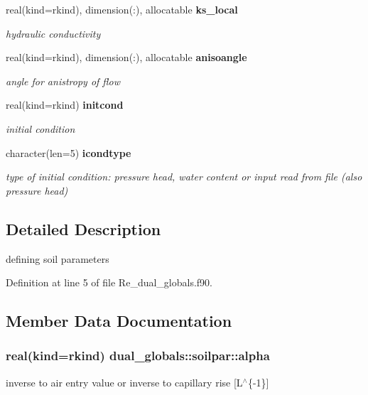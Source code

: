 \begin{DoxyCompactItemize}
real(kind=rkind), dimension(\+:), allocatable {\bf ks\+\_\+local}
\begin{DoxyCompactList}\small\item\em hydraulic conductivity \end{DoxyCompactList}\item 
real(kind=rkind), dimension(\+:), allocatable {\bf anisoangle}
\begin{DoxyCompactList}\small\item\em angle for anistropy of flow \end{DoxyCompactList}\item 
real(kind=rkind) {\bf initcond}
\begin{DoxyCompactList}\small\item\em initial condition \end{DoxyCompactList}\item 
character(len=5) {\bf icondtype}
\begin{DoxyCompactList}\small\item\em type of initial condition\+: pressure head, water content or input read from file (also pressure head) \end{DoxyCompactList}\end{DoxyCompactItemize}


\subsection{Detailed Description}
defining soil parameters 

Definition at line 5 of file Re\+\_\+dual\+\_\+globals.\+f90.



\subsection{Member Data Documentation}
\subsubsection[{alpha}]{\setlength{\rightskip}{0pt plus 5cm}real(kind=rkind) dual\+\_\+globals\+::soilpar\+::alpha}\label{structdual__globals_1_1soilpar_abceeba3b3c9ac4ed88b825cfb0597dd1}


inverse to air entry value or inverse to capillary rise [L$^\wedge$\{-\/1\}] 



